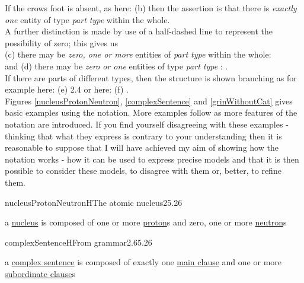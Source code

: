 \noindent If the crows foot is absent, as here: (b)
then the assertion is that there is \textit{exactly one} entity of type \textit{part type} within the whole. \\


\noindent A further distinction is made by use of a half-dashed line to represent the possibility of zero; this gives us \\

\noindent (c) there may be \textit{zero, one or more} entities of  \textit{part type} within the whole:
 \\
\noindent and (d) there may be \textit{zero or one} entities of type \textit{part type} :
.\\


\noindent If there are parts of different types, then the structure is shown branching as for example here: (e)
 {2.4}
or here: (f)
. \\


\noindent Figures \ref{nucleusProtonNeutron}, \ref{complexSentence} and \ref{grinWithoutCat} gives basic examples using the notation. 
More examples follow as more features of the notation are introduced. 
If you find yourself disagreeing with these examples - thinking that what they express 
is contrary to your understanding then it is reasonable to suppose that I will have achieved 
my aim of showing how the notation works - how it can be used to express precise models and that 
it is then possible to consider these models, to disagree with them or, better, to 
refine them.

\begin{ernotedDimFigPW}{nucleusProtonNeutron}{H}{The atomic nucleus}{2}{5.2}{6}
\item{a \underline{nucleus} is composed of one or more \underline{proton}s
and zero,  one or more \underline{neutron}s}
\end{ernotedDimFigPW}

\begin{ernotedDimFigPW}{complexSentence}{H}{From grammar}{2.6}{5.2}{6}
\item{a \underline{complex sentence} is composed of exactly one \underline{main clause}
and one or more \underline{subordinate clause}s}
\end{ernotedDimFigPW}

